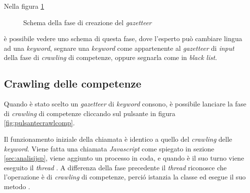 \documentclass[tesi.tex]{subfiles}
\begin{document}
Nella figura \ref{fig:creazionegaz}
\begin{figure}
  \begin{center}
  \end{center}
  \caption{Schema della fase di creazione del \emph{gazetteer}}
  \label{fig:creazionegaz}
\end{figure}
\`e possibile vedere uno schema di questa fase, dove l'esperto
pu\`o
cambiare lingua ad una \emph{keyword}, segnare una \emph{keyword} come
appartenente al \emph{gazetteer} di \emph{input} della fase di
\emph{crawling} di competenze, oppure segnarla come in \emph{black
  list}.

\subsection{Crawling delle competenze}\label{sec:crawlingcomp}
Quando \`e stato scelto un \emph{gazetteer} di \emph{keyword} consono,
\`e possibile lanciare la fase di \emph{crawling} di competenze
cliccando sul pulsante in figura \ref{fig:pulsantecrawlcomp}.

Il funzionamento iniziale della chiamata \`e identico a quello del
\emph{crawling} delle \emph{keyword}. Viene fatta una chiamata
\emph{Javascript} come spiegato in sezione \ref{sec:analisijsp}, viene aggiunto un processo in
coda, e quando \`e il suo turno viene eseguito il \emph{thread}
. A differenza della fase precedente il
\emph{thread} riconosce che l'operazione \`e di \emph{crawling} di
competenze, perci\'o istanzia la classe
 ed esegue il suo metodo .
\end{document}
